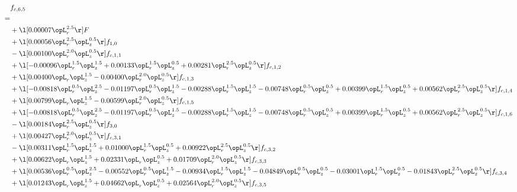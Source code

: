 \begin{alignat}{2} 
\label{eq:f_65_1} 
& f_{c,6,5} \nonumber \\ 
 = \\ 
& + \l[  0.00007 \opL_r^{2.5}  \r] F \nonumber \\ 
& + \l[  0.00056 \opL_r^{2.5} \opL_z^{0.5}  \r] f_{1,0} \nonumber \\ 
& - \l[  0.00100 \opL_r^{2.0} \opL_z^{0.5}  \r] f_{c,1,1} \nonumber \\ 
& + \l[  -0.00096 \opL_r^{1.5} \opL_z^{1.5} +  0.00133 \opL_r^{1.5} \opL_z^{0.5} +  0.00281 \opL_r^{2.5} \opL_z^{0.5}  \r] f_{c,1,2} \nonumber \\ 
& + \l[  0.00400 \opL_r \opL_z^{1.5}   -0.00400 \opL_r^{2.0} \opL_z^{0.5}  \r] f_{c,1,3} \nonumber \\ 
& + \l[  -0.00818 \opL_r^{0.5} \opL_z^{2.5}   -0.01197 \opL_r^{0.5} \opL_z^{1.5}   -0.00288 \opL_r^{1.5} \opL_z^{1.5}   -0.00748 \opL_r^{0.5} \opL_z^{0.5} +  0.00399 \opL_r^{1.5} \opL_z^{0.5} +  0.00562 \opL_r^{2.5} \opL_z^{0.5}  \r] f_{c,1,4} \nonumber \\ 
& + \l[  0.00799 \opL_r \opL_z^{1.5}   -0.00599 \opL_r^{2.0} \opL_z^{0.5}  \r] f_{c,1,5} \nonumber \\ 
& + \l[  -0.00818 \opL_r^{0.5} \opL_z^{2.5}   -0.01197 \opL_r^{0.5} \opL_z^{1.5}   -0.00288 \opL_r^{1.5} \opL_z^{1.5}   -0.00748 \opL_r^{0.5} \opL_z^{0.5} +  0.00399 \opL_r^{1.5} \opL_z^{0.5} +  0.00562 \opL_r^{2.5} \opL_z^{0.5}  \r] f_{c,1,6} \nonumber \\ 
& - \l[  0.00184 \opL_r^{2.5} \opL_z^{0.5}  \r] f_{3,0} \nonumber \\ 
& + \l[  0.00427 \opL_r^{2.0} \opL_z^{0.5}  \r] f_{c,3,1} \nonumber \\ 
& - \l[  0.00311 \opL_r^{1.5} \opL_z^{1.5} +  0.01000 \opL_r^{1.5} \opL_z^{0.5} +  0.00922 \opL_r^{2.5} \opL_z^{0.5}  \r] f_{c,3,2} \nonumber \\ 
& + \l[  0.00622 \opL_r \opL_z^{1.5} +  0.02331 \opL_r \opL_z^{0.5} +  0.01709 \opL_r^{2.0} \opL_z^{0.5}  \r] f_{c,3,3} \nonumber \\ 
& + \l[  0.00536 \opL_r^{0.5} \opL_z^{2.5}   -0.00552 \opL_r^{0.5} \opL_z^{1.5}   -0.00934 \opL_r^{1.5} \opL_z^{1.5}   -0.04849 \opL_r^{0.5} \opL_z^{0.5}   -0.03001 \opL_r^{1.5} \opL_z^{0.5}   -0.01843 \opL_r^{2.5} \opL_z^{0.5}  \r] f_{c,3,4} \nonumber \\ 
& + \l[  0.01243 \opL_r \opL_z^{1.5} +  0.04662 \opL_r \opL_z^{0.5} +  0.02564 \opL_r^{2.0} \opL_z^{0.5}  \r] f_{c,3,5} \nonumber \\ 

\end{alignat}
